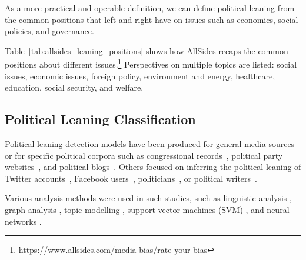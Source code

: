 As a more practical and operable definition, we can define political leaning from the common positions that left and right have on issues such as economics, social policies, and governance.

Table~\ref{tab:allsides_leaning_positions} shows how AllSides recaps the common positions about different issues.\footnote{\url{https://www.allsides.com/media-bias/rate-your-bias}}
Perspectives on multiple topics are listed: social issues, economic issues, foreign policy, environment and energy, healthcare, education, social security, and welfare.




\subsection{\statusgreen Political Leaning Classification}
\label{ssec:lit_leaning_classification}




Political leaning detection models have been produced for general media sources~\citep{budak} or for 
specific political corpora such as congressional records~\citep{gentzkow}, political party websites~\citep{yan2017perils}, and political blogs~\citep{ahmed201}.  
Others focused on inferring the political leaning of Twitter accounts~\citep{Cohen2013ClassifyingPO}, Facebook users~\citep{Bakshy1130}, politicians~\citep{thomas-etal-2006-get}, or political writers~\citep{iyyer-etal-2014-political}. 

Various analysis methods were used in such studies, such as linguistic analysis \citep{gentzkow}, graph analysis \citep{chen2017opinion}, topic modelling \citep{ahmed201, Cohen2013ClassifyingPO}, support vector machines (SVM) \citep{Bakshy1130,thomas-etal-2006-get}, and neural networks \citep{iyyer-etal-2014-political,baly2020we}.




